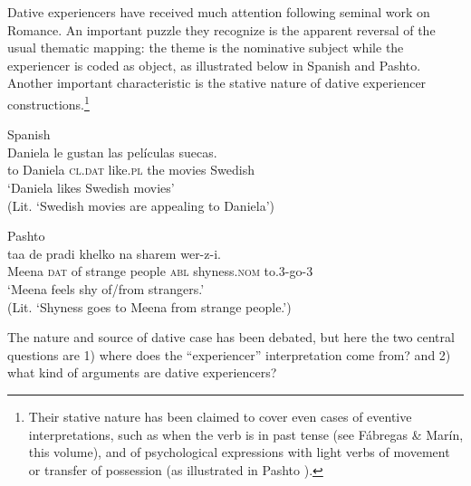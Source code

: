 \documentclass[output=paper,colorlinks,citecolor=brown,nonflat]{./langscibook}
\begin{document}
Dative experiencers have received much attention following  seminal work on Romance. An important puzzle they  recognize is the apparent reversal of the usual thematic mapping: the theme is the nominative subject while the experiencer is coded as object, as illustrated below in Spanish and Pashto. Another important characteristic is the stative nature of dative experiencer constructions.\footnote{Their stative nature has been claimed to cover even cases of eventive interpretations, such as when the verb is in past tense (see Fábregas \& Marín, this volume), and of psychological expressions with light verbs of movement or transfer of possession (as illustrated in Pashto ).}\ 

\ea%
    \label{ex:cuervo:13}
    Spanish\\
     {Daniela}  {le}     {gustan}  {las} {películas} {suecas}.\\
    {to} Daniela \textsc{cl.dat} like.\textsc{pl}  the movies Swedish\\
    \glt ‘Daniela likes Swedish movies’\\
    (Lit. ‘Swedish movies are appealing to Daniela’)
    \z

\ea%
    \label{ex:cuervo:14}
    Pashto\\
     {taa} {de}  {pradi}   {khelko} {na} {sharem}       {wer-z-i}.\\
    Meena \textsc{dat} of   strange people \textsc{abl} shyness.\textsc{nom} to.3-go-3\\
    \glt ‘Meena feels shy of/from strangers.’   \citep{Babrakzai1999}\\
    (Lit. ‘Shyness goes to Meena from strange people.’)
    \z

The nature and source of dative case has been debated, but here the two central questions are 1) where does the “experiencer” interpretation come from? and 2) what kind of arguments are dative experiencers?
\end{document}
